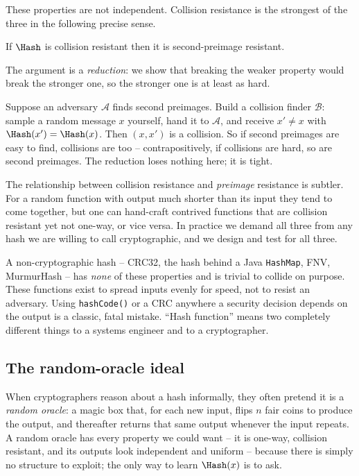 These properties are not independent. Collision resistance is the strongest of the three in the following precise sense.

\begin{proposition}
\label{ch14:cr-implies-spr}
If $\Hash$ is collision resistant then it is second-preimage resistant.
\end{proposition}

\begin{whybox}
The argument is a \emph{reduction}: we show that breaking the weaker property would break the stronger one, so the stronger one is at least as hard.

Suppose an adversary $\mathcal{A}$ finds second preimages. Build a collision finder $\mathcal{B}$: sample a random message $x$ yourself, hand it to $\mathcal{A}$, and receive $x' \ne x$ with $\Hash(x') = \Hash(x)$. Then $(x, x')$ is a collision. So if second preimages are easy to find, collisions are too -- contrapositively, if collisions are hard, so are second preimages. The reduction loses nothing here; it is tight.
\end{whybox}

The relationship between collision resistance and \emph{preimage} resistance is subtler. For a random function with output much shorter than its input they tend to come together, but one can hand-craft contrived functions that are collision resistant yet not one-way, or vice versa. In practice we demand all three from any hash we are willing to call cryptographic, and we design and test for all three.

\begin{trapbox}
A non-cryptographic hash -- CRC32, the hash behind a Java \texttt{HashMap}, FNV, MurmurHash -- has \emph{none} of these properties and is trivial to collide on purpose. These functions exist to spread inputs evenly for speed, not to resist an adversary. Using \texttt{hashCode()} or a CRC anywhere a security decision depends on the output is a classic, fatal mistake. ``Hash function'' means two completely different things to a systems engineer and to a cryptographer.
\end{trapbox}

\subsection{The random-oracle ideal}

When cryptographers reason about a hash informally, they often pretend it is a \emph{random oracle}: a magic box that, for each new input, flips $n$ fair coins to produce the output, and thereafter returns that same output whenever the input repeats. A random oracle has every property we could want -- it is one-way, collision resistant, and its outputs look independent and uniform -- because there is simply no structure to exploit; the only way to learn $\Hash(x)$ is to ask.

